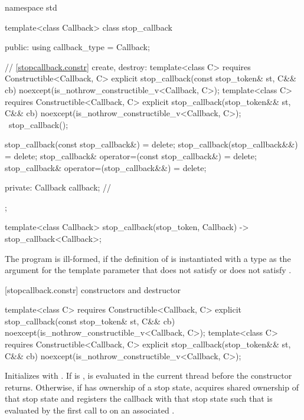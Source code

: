 {\begin{codeblock}
namespace std {
  template<class Callback>
  class stop_callback {
  public:
    using callback_type = Callback;

    // \ref{stopcallback.constr} create, destroy:
    template<class C>
        requires Constructible<Callback, C>
    explicit stop_callback(const stop_token& st, C&& cb)
        noexcept(is_nothrow_constructible_v<Callback, C>);
    template<class C>
        requires Constructible<Callback, C>
    explicit stop_callback(stop_token&& st, C&& cb)
        noexcept(is_nothrow_constructible_v<Callback, C>);
    ~stop_callback();

    stop_callback(const stop_callback&) = delete;
    stop_callback(stop_callback&&) = delete;
    stop_callback& operator=(const stop_callback&) = delete;
    stop_callback& operator=(stop_callback&&) = delete;

  private:
    Callback callback;      // \expos
  };

  template<class Callback>
  stop_callback(stop_token, Callback) -> stop_callback<Callback>;
}
\end{codeblock}

The program is ill-formed, if the definition of  is
instantiated with a type as the argument for the template parameter
 that does not satisfy  or does not satisfy
.

[stopcallback.constr]{ constructors and destructor}

%
\begin{itemdecl}
template<class C>
  requires Constructible<Callback, C>
explicit stop_callback(const stop_token& st, C&& cb)
  noexcept(is_nothrow_constructible_v<Callback, C>);
template<class C>
  requires Constructible<Callback, C>
explicit stop_callback(stop_token&& st, C&& cb)
  noexcept(is_nothrow_constructible_v<Callback, C>);
\end{itemdecl}
\begin{itemdescr}
  \pnum\effects Initializes  with .
                If  is ,
                is evaluated
                in the current thread before the constructor returns.
                Otherwise, if  has ownership of a stop state,
                acquires shared ownership of that stop state and registers
                the callback with that stop state such that 
                is evaluated by the first call to  on an associated
                .


\end{itemdescr}}
